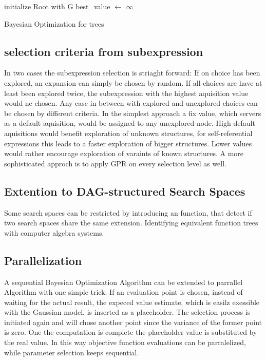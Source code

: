 \documentclass[english]{article}
\begin{document}
\begin{algorithm}[H]
\SetAlgoLined
initialize Root with G\;
best\_value $\leftarrow$ $\infty$\;


\caption{Bayesian Optimization for trees}

\end{algorithm}
%
\subsection*{selection criteria from subexpression}
In two cases the subexpression selection is striaght forward: If on choice has been explored, an expansion can simply be chosen by random. If all choices are have at least been explored twice, the subexpression with the highest aquisition value would ne chosen. Any case in between with explored and unexplored choices can be chosen by different criteria.
In the simplest approach a fix value, which servers as a default aquisition, would be assigned to any unexplored node. High default aquisitions would benefit exploration of unknown structures, for self-referential expressions this leads to a faster exploration of bigger structures. Lower values would rather encourage exploration of varaints of known structures.
A more sophisticated approch is to apply \ac{GPR} on every selection level as well.


\subsection{Extention to DAG-structured Search Spaces}
Some search spaces can be restricted by introducing an function, that detect if two search spaces share the same extension.
Identifying equivalent function trees with computer algebra systems.

\subsection{Parallelization}
A sequential Bayesian Optimization Algorithm can be extended to parrallel Algorithm with one simple trick. If an evaluation point is chosen, instead of waiting for the actual result, the expeced value estimate, which is easilz exessible with the Gaussian model, is inserted as a placeholder. The selection process is initiated again and will chose another point since the variance of the former point is zero. One the computation is complete the placeholder value is substituted by the real value. In this way objective function evaluations can be parralelized, while parameter selection keeps sequential.
\end{document}
